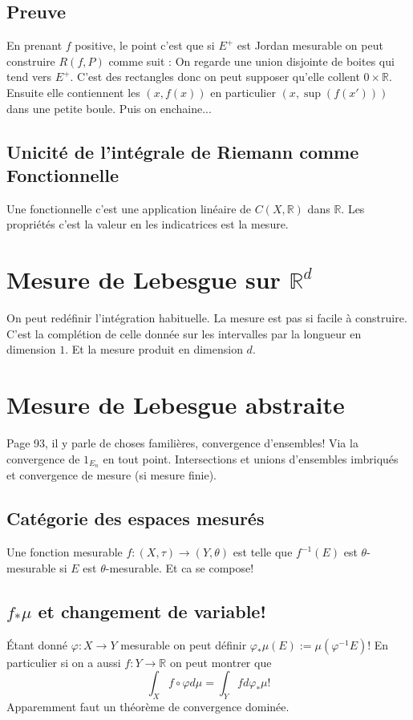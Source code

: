 \documentclass[a4paper,12pt]{book}
\newcommand{\R}{\mathbb{R}}
\theoremstyle{plain}
\theoremstyle{definition}
\theoremstyle{remark}
\begin{document}
\subsection{Preuve}
En prenant $f$ positive, le point c'est que si $E^+$ est
Jordan mesurable on peut construire $R(f,P)$ comme suit :
On regarde une union disjointe de boites qui tend vers 
$E^+$. C'est des rectangles donc on peut supposer qu'elle
collent $0\times \R$. Ensuite elle contiennent les $(x,f(x))$
en particulier $(x,\sup(f(x')))$ dans une petite boule. Puis
on enchaine...
\subsection{Unicité de l'intégrale de Riemann comme Fonctionnelle}
Une fonctionnelle c'est une application linéaire de $C(X,\R)$ dans
$\R$. Les propriétés c'est la valeur en les indicatrices est la
mesure.


\section{Mesure de Lebesgue sur $\R^d$}
On peut redéfinir l'intégration habituelle. La mesure est 
pas si facile à construire. C'est la complétion de celle donnée
sur les intervalles par la longueur en dimension $1$. Et la mesure
produit en dimension $d$.
\section{Mesure de Lebesgue abstraite}
Page 93, il y parle de choses familières, convergence
d'ensembles! Via la convergence de $1_{E_n}$ en tout
point. Intersections et unions d'ensembles imbriqués
et convergence de mesure (si mesure finie).
\subsection{Catégorie des espaces mesurés}
Une fonction mesurable $f\colon (X,\tau)\to (Y,\theta)$
est telle que $f^{-1}(E)$ est $\theta$-mesurable si
$E$ est $\theta$-mesurable. Et ca se compose! 
\subsection{$f_*\mu$ et changement de variable!}
Étant donné $\varphi\colon X\to Y$ mesurable on peut définir
$\varphi_*\mu(E):=\mu(\varphi^{-1}E)$! En particulier
si on a aussi $f\colon Y\to \R$ on peut montrer que
\[\int_X f\circ \varphi d\mu=\int_Yfd\varphi_*\mu!\]
Apparemment faut un théorème de convergence dominée.
\end{document}
